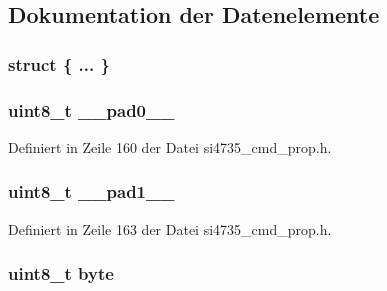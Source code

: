 \subsection{Dokumentation der Datenelemente}
\hypertarget{unionfm__rds__status__resp1_af30492868ae91ee0c9c52a7a7bcc34d8}{}\subsubsection[{"@23}]{\setlength{\rightskip}{0pt plus 5cm}struct \{ ... \} }\label{unionfm__rds__status__resp1_af30492868ae91ee0c9c52a7a7bcc34d8}
\hypertarget{unionfm__rds__status__resp1_a8b4eebe79ded0459acec2f4950102ba3}{}
\subsubsection[{\+\_\+\+\_\+pad0\+\_\+\+\_\+}]{\setlength{\rightskip}{0pt plus 5cm}uint8\+\_\+t \+\_\+\+\_\+pad0\+\_\+\+\_\+}\label{unionfm__rds__status__resp1_a8b4eebe79ded0459acec2f4950102ba3}


Definiert in Zeile 160 der Datei si4735\+\_\+cmd\+\_\+prop.\+h.

\hypertarget{unionfm__rds__status__resp1_a77f12d2e278bd5c07712648ac0df5e08}{}
\subsubsection[{\+\_\+\+\_\+pad1\+\_\+\+\_\+}]{\setlength{\rightskip}{0pt plus 5cm}uint8\+\_\+t \+\_\+\+\_\+pad1\+\_\+\+\_\+}\label{unionfm__rds__status__resp1_a77f12d2e278bd5c07712648ac0df5e08}


Definiert in Zeile 163 der Datei si4735\+\_\+cmd\+\_\+prop.\+h.

\hypertarget{unionfm__rds__status__resp1_a96f44d20f1dbf1c8785a7bc99a46164c}{}
\subsubsection[{byte}]{\setlength{\rightskip}{0pt plus 5cm}uint8\+\_\+t byte}\label{unionfm__rds__status__resp1_a96f44d20f1dbf1c8785a7bc99a46164c}


